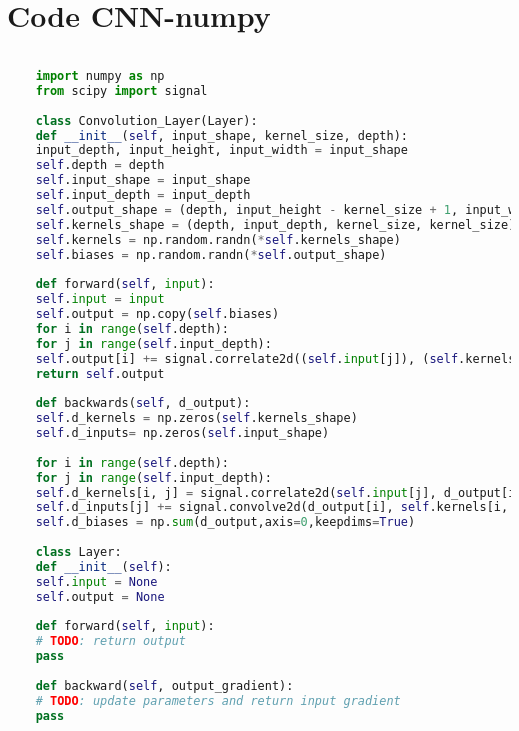 \section{Code CNN-numpy}

\begin{lstlisting}[language=Python, caption=Convolutional Layer]
	
	import numpy as np
	from scipy import signal
	
	class Convolution_Layer(Layer):
	def __init__(self, input_shape, kernel_size, depth):
	input_depth, input_height, input_width = input_shape
	self.depth = depth
	self.input_shape = input_shape
	self.input_depth = input_depth
	self.output_shape = (depth, input_height - kernel_size + 1, input_width - kernel_size + 1)
	self.kernels_shape = (depth, input_depth, kernel_size, kernel_size) # Το depth μας δίνει τον αριθμο των kernels, Το input depth τις διαστασεις του input, και το kernel size μας δινει το μεγεθος του πινακα στους kernel
	self.kernels = np.random.randn(*self.kernels_shape)                # Για παραδειγμα αν εχω ενα τρισδιαστατο input(3 καναλια), και εχω βαλει depth 5, και kernel sizei 3*3, θα εχω(5,3,3,3) 
	self.biases = np.random.randn(*self.output_shape)
	
	def forward(self, input):
	self.input = input
	self.output = np.copy(self.biases)
	for i in range(self.depth):
	for j in range(self.input_depth):
	self.output[i] += signal.correlate2d((self.input[j]), (self.kernels[i, j]), "valid")
	return self.output
	
	def backwards(self, d_output):
	self.d_kernels = np.zeros(self.kernels_shape)
	self.d_inputs= np.zeros(self.input_shape)
	
	for i in range(self.depth):
	for j in range(self.input_depth):
	self.d_kernels[i, j] = signal.correlate2d(self.input[j], d_output[i], "valid")
	self.d_inputs[j] += signal.convolve2d(d_output[i], self.kernels[i, j], "full")
	self.d_biases = np.sum(d_output,axis=0,keepdims=True)  
	
	class Layer:
	def __init__(self):
	self.input = None
	self.output = None
	
	def forward(self, input):
	# TODO: return output
	pass
	
	def backward(self, output_gradient):
	# TODO: update parameters and return input gradient
	pass
	
\end{lstlisting}


